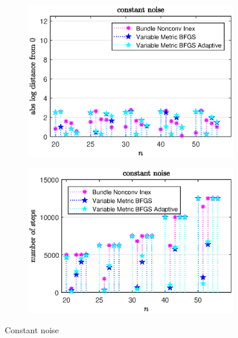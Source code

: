\begin{figure}[H]
	\begin{subfigure}{0.49\textwidth}
		\includegraphics[width=\textwidth]{Pictures/Plots/constant_noise_b.eps}%
	\end{subfigure}
	\begin{subfigure}{0.49\textwidth}
		\includegraphics[width=\textwidth]{Pictures/Plots/steps_constant_noise_b.eps}%
	\end{subfigure}
	\caption{Constant noise}%
	\label{fig_const_noise_large}%
\end{figure}

